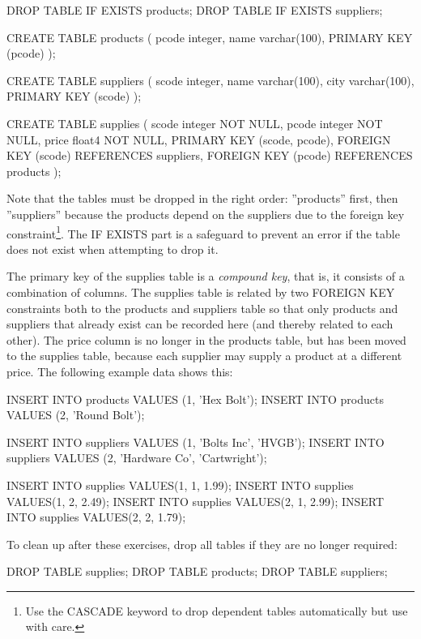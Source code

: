 \begin{sqlcode}
DROP TABLE IF EXISTS products;
DROP TABLE IF EXISTS suppliers;

CREATE TABLE products (
  pcode integer,
  name  varchar(100),
  PRIMARY KEY (pcode) );

CREATE TABLE suppliers (
  scode integer,
  name  varchar(100),
  city  varchar(100),
  PRIMARY KEY (scode) );
  
CREATE TABLE supplies (
  scode  integer NOT NULL,
  pcode  integer NOT NULL,
  price  float4 NOT NULL,
  PRIMARY KEY (scode, pcode),
  FOREIGN KEY (scode) REFERENCES suppliers,
  FOREIGN KEY (pcode) REFERENCES products );
\end{sqlcode}

Note that the tables must be dropped in the right order: ''products'' first, then ''suppliers'' because the products depend on the suppliers due to the foreign key constraint\footnote{Use the CASCADE keyword to drop dependent tables automatically but use with care.}. The IF EXISTS part is a safeguard to prevent an error if the table does not exist when attempting to drop it.

The primary key of the supplies table is a \emph{compound key}, that is, it consists of a combination of columns. The supplies table is related by two FOREIGN KEY constraints both to the products and suppliers table so that only products and suppliers that already exist can be recorded here (and thereby related to each other). The price column is no longer in the products table, but has been moved to the supplies table, because each supplier may supply a product at a different price. The following example data shows this:

\begin{sqlcode}
INSERT INTO products VALUES (1, 'Hex Bolt');
INSERT INTO products VALUES (2, 'Round Bolt');

INSERT INTO suppliers VALUES (1, 'Bolts Inc', 'HVGB');
INSERT INTO suppliers VALUES (2, 'Hardware Co', 'Cartwright');

INSERT INTO supplies VALUES(1, 1, 1.99);
INSERT INTO supplies VALUES(1, 2, 2.49);
INSERT INTO supplies VALUES(2, 1, 2.99);
INSERT INTO supplies VALUES(2, 2, 1.79);
\end{sqlcode}

\noindent To clean up after these exercises, drop all tables if they are no longer required:

\begin{sqlcode}
DROP TABLE supplies;
DROP TABLE products;
DROP TABLE suppliers;
\end{sqlcode}

